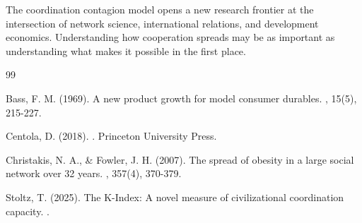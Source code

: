 \documentclass[12pt,a4paper]{article}
\begin{document}
The coordination contagion model opens a new research frontier at the intersection of network science, international relations, and development economics. Understanding how cooperation spreads may be as important as understanding what makes it possible in the first place.




\begin{thebibliography}{99}

Bass, F. M. (1969).
\newblock A new product growth for model consumer durables.
, 15(5), 215-227.

Centola, D. (2018).
.
\newblock Princeton University Press.

Christakis, N. A., \& Fowler, J. H. (2007).
\newblock The spread of obesity in a large social network over 32 years.
, 357(4), 370-379.

Stoltz, T. (2025).
\newblock The K-Index: A novel measure of civilizational coordination capacity.
.

\end{thebibliography}
\end{document}
